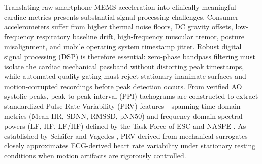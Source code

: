 Translating raw smartphone MEMS acceleration into clinically meaningful cardiac metrics presents substantial signal-processing challenges. Consumer accelerometers suffer from higher thermal noise floors, DC gravity offsets, low-frequency respiratory baseline drift, high-frequency muscular tremor, posture misalignment, and mobile operating system timestamp jitter. Robust digital signal processing (DSP) is therefore essential: zero-phase bandpass filtering must isolate the cardiac mechanical passband without distorting peak timestamps, while automated quality gating must reject stationary inanimate surfaces and motion-corrupted recordings before peak detection occurs. From verified AO systolic peaks, peak-to-peak interval (PPI) tachograms are constructed to extract standardized Pulse Rate Variability (PRV) features---spanning time-domain metrics (Mean HR, SDNN, RMSSD, pNN50) and frequency-domain spectral powers (LF, HF, LF/HF) defined by the Task Force of ESC and NASPE \cite{taskforce1996heart}. As established by Sch{\"a}fer and Vagedes \cite{schafer2013accurate}, PRV derived from mechanical surrogates closely approximates ECG-derived heart rate variability under stationary resting conditions when motion artifacts are rigorously controlled.

